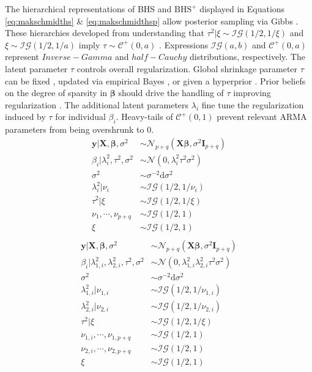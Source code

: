 The hierarchical representations of BHS and $\textrm{BHS}^+$ displayed in Equations \ref{eq:makschmidths} \& \ref{eq:makschmidthsp} allow posterior sampling via Gibbs \citep{Makalic2016b}. These hierarchies developed from understanding that $\tau^2|\xi \sim \mathcal{IG}(1/2,1/\xi)$ and $\xi\sim\mathcal{IG}(1/2,1/a)$ imply $\tau\sim\mathcal{C}^+(0,a)$ \citep{Wand2011}. Expressions $\mathcal{IG}(a,b)$ and $\mathcal{C}^+(0,a)$ represent $Inverse-Gamma$ and $half-Cauchy$ distributions, respectively. The latent parameter $\tau$ controls overall regularization. Global shrinkage parameter $\tau$ can be fixed \citep{vanderPas2014}, updated via empirical Bayes \citep{Johnstone2004}, or given a hyperprior \citep{Carvalho2009,Carvalho2010}. Prior beliefs on the degree of sparsity in $\bm{\beta}$  should drive the handling of $\tau$ improving regularization \citep{vanderPas2014,Piironen2016}. The additional latent parameters $\lambda_i$ fine tune the regularization induced by $\tau$ for individual $\beta_i$. Heavy-tails of $\mathcal{C}^+(0,1)$ prevent relevant ARMA parameters from being overshrunk to 0.
\begin{equation}
\label{eq:makschmidths}
\begin{split}
\bm{y}|\bm{X},\bm{\beta},\sigma^2 & \sim \mathcal{N}_{p+q}(\bm{X}\bm{\beta},\sigma^2\bm{I}_{p+q}) \\
\beta_i|\lambda^2_i,\tau^2,\sigma^2 & \sim \mathcal{N}(0,\lambda^2_i\tau^2\sigma^2) \\
\sigma^2 & \sim \sigma^{-2}\textrm{d}\sigma^2 \\
\lambda^2_i|\nu_i & \sim \mathcal{IG}(1/2,1/\nu_i)\\
\tau^2|\xi & \sim \mathcal{IG}(1/2,1/\xi)\\
\nu_1,\cdots, \nu_{p+q}& \sim \mathcal{IG}(1/2,1) \\
\xi & \sim \mathcal{IG}(1/2,1) \\
\end{split}
\end{equation}
\begin{equation}
\label{eq:makschmidthsp}
\begin{split}
\bm{y}|\bm{X},\bm{\beta},\sigma^2 & \sim \mathcal{N}_{p+q}(\bm{X}\bm{\beta},\sigma^2\bm{I}_{p+q}) \\
\beta_i|\lambda^2_{1,i},\lambda^2_{2,i},\tau^2,\sigma^2 & \sim \mathcal{N}(0,\lambda^2_{1,i}\lambda^2_{2,i}\tau^2\sigma^2) \\
\sigma^2 & \sim \sigma^{-2}\textrm{d}\sigma^2 \\
\lambda^2_{1,i}|\nu_{1,i} & \sim \mathcal{IG}(1/2,1/\nu_{1,i})\\
\lambda^2_{2,i}|\nu_{2,i} & \sim \mathcal{IG}(1/2,1/\nu_{2,i})\\
\tau^2|\xi & \sim \mathcal{IG}(1/2,1/\xi)\\
\nu_{1,i},\cdots, \nu_{1,p+q} & \sim \mathcal{IG}(1/2,1) \\
\nu_{2,i},\cdots, \nu_{2,p+q} & \sim \mathcal{IG}(1/2,1) \\
\xi & \sim \mathcal{IG}(1/2,1) \\
\end{split}
\end{equation}

